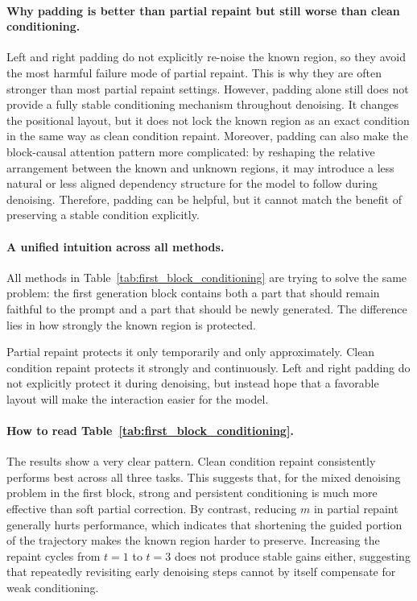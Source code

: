 \paragraph{Why padding is better than partial repaint but still worse than clean conditioning.}
Left and right padding do not explicitly re-noise the known region, so they avoid the most harmful failure mode of partial repaint. This is why they are often stronger than most partial repaint settings. However, padding alone still does not provide a fully stable conditioning mechanism throughout denoising. It changes the positional layout, but it does not lock the known region as an exact condition in the same way as clean condition repaint. Moreover, padding can also make the block-causal attention pattern more complicated: by reshaping the relative arrangement between the known and unknown regions, it may introduce a less natural or less aligned dependency structure for the model to follow during denoising. Therefore, padding can be helpful, but it cannot match the benefit of preserving a stable condition explicitly.

\paragraph{A unified intuition across all methods.}
All methods in Table~\ref{tab:first_block_conditioning} are trying to solve the same problem: the first generation block contains both a part that should remain faithful to the prompt and a part that should be newly generated. The difference lies in how strongly the known region is protected.

Partial repaint protects it only temporarily and only approximately. Clean condition repaint protects it strongly and continuously. Left and right padding do not explicitly protect it during denoising, but instead hope that a favorable layout will make the interaction easier for the model.

\paragraph{How to read Table~\ref{tab:first_block_conditioning}.}
The results show a very clear pattern. Clean condition repaint consistently performs best across all three tasks. This suggests that, for the mixed denoising problem in the first block, strong and persistent conditioning is much more effective than soft partial correction. By contrast, reducing \(m\) in partial repaint generally hurts performance, which indicates that shortening the guided portion of the trajectory makes the known region harder to preserve. Increasing the repaint cycles from \(t=1\) to \(t=3\) does not produce stable gains either, suggesting that repeatedly revisiting early denoising steps cannot by itself compensate for weak conditioning.

